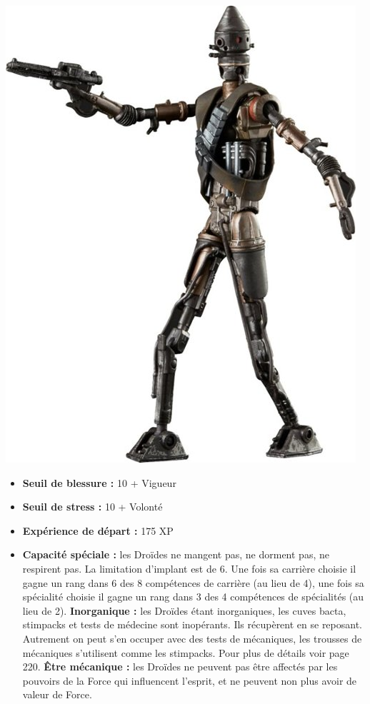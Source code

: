 \documentclass[twoside]{article}
\begin{document}
\noindent\begin{minipage}{0.3\textwidth}
	\includegraphics[width=1\linewidth]{../_img/species/droid}
\end{minipage}%
\hfill%
\begin{minipage}{0.7\textwidth}\raggedleft
	\begin{itemize}
		\item \textbf{Seuil de blessure :} 10 + Vigueur 
		\item \textbf{Seuil de stress :} 10 + Volonté 
		\item \textbf{Expérience de départ :} 175 XP
		\item \textbf{Capacité spéciale :} les Droïdes ne mangent pas, ne dorment pas, ne respirent pas. La limitation d'implant est de 6. Une fois sa carrière choisie il gagne un rang dans 6 des 8 compétences de carrière (au lieu de 4), une fois sa spécialité choisie il gagne un rang dans 3 des 4 compétences de spécialités (au lieu de 2). \textbf{Inorganique :} les Droïdes étant inorganiques, les cuves bacta, stimpacks et tests de médecine sont inopérants. Ils récupèrent en se reposant. Autrement on peut s'en occuper avec des tests de mécaniques, les trousses de mécaniques s'utilisent comme les stimpacks. Pour plus de détails voir page 220. \textbf{Être mécanique : }les Droïdes ne peuvent pas être affectés par les pouvoirs de la Force qui influencent l'esprit, et ne peuvent non plus avoir de valeur de Force.
	\end{itemize}
\end{minipage}
\end{document}
